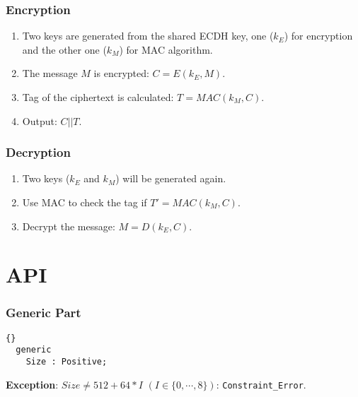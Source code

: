 \subsubsection*{Encryption}
\begin{enumerate}
\item Two keys are generated from the shared ECDH key, one ($k_E$) for encryption and the other one ($k_M$) for MAC algorithm.
\item The message $M$ is encrypted: $C=E({k_E},M)$.
\item Tag of the ciphertext is calculated: $T=MAC({k_M},C)$.
\item Output: $C||T$.
\end{enumerate}
\subsubsection*{Decryption}
\begin{enumerate}
\item Two keys ($k_E$ and $k_M$) will be generated again. 
\item Use MAC to check the tag if $T'=MAC({k_M},C)$.
\item Decrypt the message: $M=D({k_E},C)$.
\end{enumerate}
\section{API}
\subsubsection*{Generic Part}
\begin{lstlisting}{}
  generic
    Size : Positive;
\end{lstlisting}
\textbf{Exception}: $Size\neq 512+64*I$ $(I\in \{0,\cdots,8\})$: \texttt{Constraint\_Error}.\\
